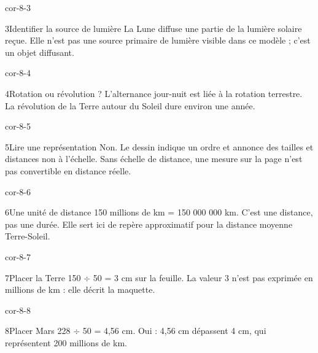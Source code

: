 \documentclass[12pt,twoside,openany]{book}
\begin{document}
\begin{blocLivre}{cor-8-3}
\begin{corrige}{3}{Identifier la source de lumière}
La Lune diffuse une partie de la lumière solaire reçue. Elle n’est pas une source primaire de lumière visible dans ce modèle ; c’est un objet diffusant.\par
\end{corrige}\end{blocLivre}
\begin{blocLivre}{cor-8-4}
\begin{corrige}{4}{Rotation ou révolution ?}
L’alternance jour-nuit est liée à la rotation terrestre. La révolution de la Terre autour du Soleil dure environ une année.\par
\end{corrige}\end{blocLivre}
\begin{blocLivre}{cor-8-5}
\begin{corrige}{5}{Lire une représentation}
Non. Le dessin indique un ordre et annonce des tailles et distances non à l’échelle. Sans échelle de distance, une mesure sur la page n’est pas convertible en distance réelle.\par
\end{corrige}\end{blocLivre}
\begin{blocLivre}{cor-8-6}
\begin{corrige}{6}{Une unité de distance}
150 millions de km = 150 000 000 km. C’est une distance, pas une durée. Elle sert ici de repère approximatif pour la distance moyenne Terre-Soleil.\par
\end{corrige}\end{blocLivre}
\begin{blocLivre}{cor-8-7}
\begin{corrige}{7}{Placer la Terre}
150 \(\div\) 50 = 3 cm sur la feuille. La valeur 3 n’est pas exprimée en millions de km : elle décrit la maquette.\par
\end{corrige}\end{blocLivre}
\begin{blocLivre}{cor-8-8}
\begin{corrige}{8}{Placer Mars}
228 \(\div\) 50 = 4,56 cm. Oui : 4,56 cm dépassent 4 cm, qui représentent 200 millions de km.\par
\end{corrige}\end{blocLivre}
\end{document}

